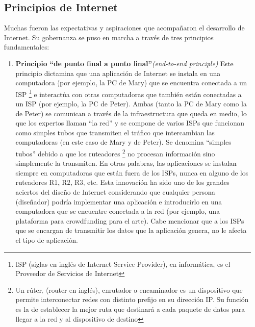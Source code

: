 \documentclass[12pt]{report} %
\begin{document}
\subsection{Principios de Internet}
Muchas fueron las expectativas y aspiraciones que acompañaron el desarrollo de Internet. Su gobernanza se puso en marcha a través de tres principios fundamentales:

\begin{enumerate}
  \item{\textbf{Principio “de punto final a punto final”}\textit{(end-to-end principle)}}  Este principio dictamina que una aplicación de Internet se instala en una computadora (por ejemplo, la PC de Mary) que se encuentra conectada a un ISP \footnote{ISP (siglas en inglés de Internet Service Provider), en informática, es el Proveedor de Servicios de Internet}  e interactúa con otras computadoras que también están conectadas a un ISP (por ejemplo, la PC de Peter). Ambas (tanto la PC de Mary como la de Peter) se comunican a través de la infraestructura que queda en medio, lo que los expertos llaman “la red” y se compone de varios ISPs que funcionan como simples tubos que transmiten el tráfico que intercambian las computadoras (en este caso de Mary y de Peter). Se denomina “simples tubos” debido a que los ruteadores \footnote{Un rúter, (router en inglés),  enrutador o encaminador es un dispositivo que permite interconectar redes con distinto prefijo en su dirección IP. Su función es la de establecer la mejor ruta que destinará a cada paquete de datos para llegar a la red y al dispositivo de destino}  no procesan información sino simplemente la transmiten.  En otras palabras, las aplicaciones se instalan siempre en computadoras que están fuera de los ISPs, nunca en alguno de los ruteadores R1, R2, R3, etc. Esta innovación ha sido uno de los grandes aciertos del diseño de Internet considerando que cualquier persona (diseñador) podría implementar una aplicación e introducirlo en una computadora que se encuentre conectada a la red (por ejemplo, una plataforma para crowdfunding para el arte). Cabe mencionar que a los ISPs que se encargan de transmitir los datos que la aplicación genera, no le afecta el tipo de aplicación.


\end{enumerate}
\end{document}
